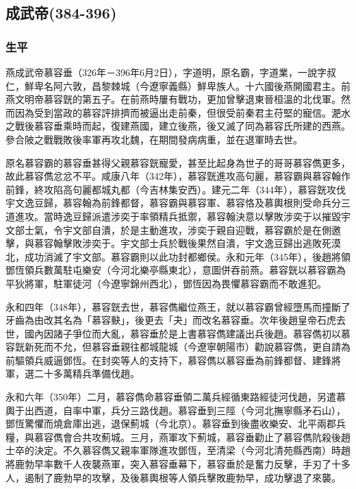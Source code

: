 
\subsection{成武帝\tiny(384-396)}

\subsubsection{生平}

燕成武帝慕容垂（326年－396年6月2日），字道明，原名霸，字道業，一說字叔仁，鮮卑名阿六敦，昌黎棘城（今遼寧義縣）鮮卑族人。十六國後燕開國君主。前燕文明帝慕容皝的第五子。在前燕時屢有戰功，更加曾擊退東晉桓溫的北伐軍。然而因為受到當政的慕容評排擠而被逼出走前秦，但很受前秦君主苻堅的寵信。淝水之戰後慕容垂乘時而起，復建燕國，建立後燕，後又滅了同為慕容氏所建的西燕。參合陂之戰戰敗後率軍再攻北魏，在期間發病病重，並在退軍時去世。

原名慕容霸的慕容垂甚得父親慕容皝寵愛，甚至比起身為世子的哥哥慕容儁更多，故此慕容儁忿忿不平。咸康八年（342年），慕容皝進攻高句麗，慕容霸與慕容翰作前鋒，終攻陷高句麗都城丸都（今吉林集安西）。建元二年（344年），慕容皝攻伐宇文逸豆歸，慕容翰為前鋒都督，慕容霸與慕容軍、慕容恪及慕輿根則受命兵分三道進攻。當時逸豆歸派遣涉奕于率領精兵抵禦，慕容翰決意以擊敗涉奕于以摧毀宇文部士氣，令宇文部自潰，於是主動進攻，涉奕于親自迎戰，慕容霸於是在側邀擊，與慕容翰擊敗涉奕于。宇文部士兵於戰後果然自潰，宇文逸豆歸出逃敗死漠北，成功消滅了宇文部。慕容霸則以此功封都鄉侯。永和元年（345年），後趙將領鄧恆領兵數萬駐屯樂安（今河北樂亭縣東北），意圖併吞前燕。慕容皝以慕容霸為平狄將軍，駐軍徒河（今遼寧錦州西北），鄧恆因為畏懼慕容霸而不敢進犯。

永和四年（348年），慕容皝去世，慕容儁繼位燕王，就以慕容霸曾經墮馬而撞斷了牙齒為由改其名為「慕容𡙇」，後更去「夬」而改名慕容垂。次年後趙皇帝石虎去世，國內因諸子爭位而大亂，慕容垂於是上書慕容儁建議出兵後趙。慕容儁初以慕容皝新死而不允，但慕容垂親往都城龍城（今遼寧朝陽市）勸說慕容儁，更自請為前驅領兵威逼鄧恆。在封奕等人的支持下，慕容儁以慕容垂為前鋒都督、建鋒將軍，選二十多萬精兵準備伐趙。

永和六年（350年）二月，慕容儁命慕容垂領二萬兵經循東路經徒河伐趙，另遣慕輿于出西道，自率中軍，兵分三路伐趙。慕容垂到三陘（今河北撫寧縣矛石山），鄧恆驚懼而燒倉庫出逃，退保薊城（今北京）。慕容垂到後盡收樂安、北平兩郡兵糧，與慕容儁會合共攻薊城。三月，燕軍攻下薊城，慕容垂勸止了慕容儁阬殺後趙士卒的決定。不久慕容儁又親率軍隊進攻鄧恆，至清梁（今河北清苑縣西南）時趙將鹿勃早率數千人夜襲燕軍，突入慕容垂幕下，慕容垂於是奮力反擊，手刃了十多人，遏制了鹿勃早的攻擊，及後慕輿根等人領兵擊敗鹿勃早，成功擊退了來襲。

